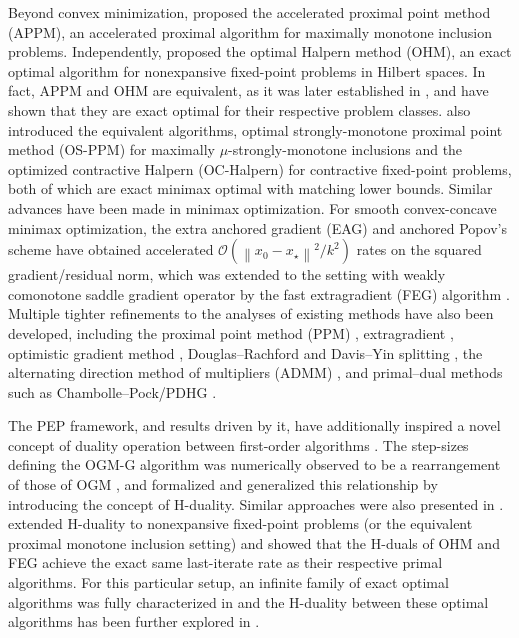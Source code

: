 \documentclass{article}
\theoremstyle{definition}
\theoremstyle{plain}
\newcommand{\cO}{{\mathcal{O}}}
\newcommand{\sqnorm}[1]{\left\| #1 \right\|^2}
\begin{document}
Beyond convex minimization, 
\cite{Kim2021_accelerated} proposed the accelerated proximal point method (APPM), an accelerated proximal algorithm for maximally monotone inclusion problems. 
Independently, \cite{Lieder2021_convergence} proposed the optimal Halpern method (OHM), an exact optimal algorithm for nonexpansive fixed-point problems in Hilbert spaces. 
In fact, APPM and OHM are equivalent, as it was later established in \cite{ContrerasCominetti2023_optimal, RyuYin2022_largescale}, and \cite{ParkRyu2022_exact} have shown that they are exact optimal for their respective problem classes. 
\cite{ParkRyu2022_exact} also introduced the equivalent algorithms, optimal strongly-monotone proximal point method (OS-PPM) for maximally $\mu$-strongly-monotone inclusions and the optimized contractive Halpern (OC-Halpern) for contractive fixed-point problems, both of which are exact minimax optimal with matching lower bounds.
Similar advances have been made in minimax optimization.
For smooth convex-concave minimax optimization, the extra anchored gradient (EAG) \citep{YoonRyu2021_accelerated} and anchored Popov's scheme \cite{Tran-DinhLuo2021_halperntype} have obtained accelerated $\cO(\sqnorm{x_0 - x_\star} / k^2)$ rates on the squared gradient/residual norm, which was extended to the setting with weakly comonotone saddle gradient operator by the fast extragradient (FEG) algorithm \cite{LeeKim2021_fast}.
Multiple tighter refinements to the analyses of existing methods have also been developed, including the proximal point method (PPM) \cite{guTightSublinearConvergence2020}, extragradient \cite{GorbunovLoizouGidel2022_extragradient}, optimistic gradient method \cite{gorbunovLastiterateConvergenceOptimistic2022}, Douglas--Rachford and Davis--Yin splitting \cite{RyuTaylorBergelingGiselsson2020_operator, NguyenSuhJiangMa2025_exact}, the alternating direction method of multipliers (ADMM) \cite{ZamaniAbbaszadehpeivastideKlerk2024_exact}, and primal--dual methods such as Chambolle--Pock/PDHG \cite{BousselmiHendrickxGlineur2024_interpolation}.

The PEP framework, and results driven by it, have additionally inspired a novel concept of duality operation between first-order algorithms \cite{KimOzdaglarParkRyu2023_timereversed}.
The step-sizes defining the OGM-G algorithm was numerically observed to be a rearrangement of those of OGM \cite{KimFessler2021_optimizing}, and \cite{KimOzdaglarParkRyu2023_timereversed} formalized and generalized this relationship by introducing the concept of H-duality.
Similar approaches were also presented in \cite{KimYang2023_unifying, KimYang2023_convergence}.
\cite{YoonKimSuhRyu2024_optimal} extended H-duality to nonexpansive fixed-point problems (or the equivalent proximal monotone inclusion setting) and showed that the H-duals of OHM and FEG achieve the exact same last-iterate rate as their respective primal algorithms.
For this particular setup, an infinite family of exact optimal algorithms was fully characterized in \cite{YoonRyuGrimmerInvariance2025} and the H-duality between these optimal algorithms has been further explored in \citep{yoon2026theorycompositiondualityextremal}.
\end{document}
